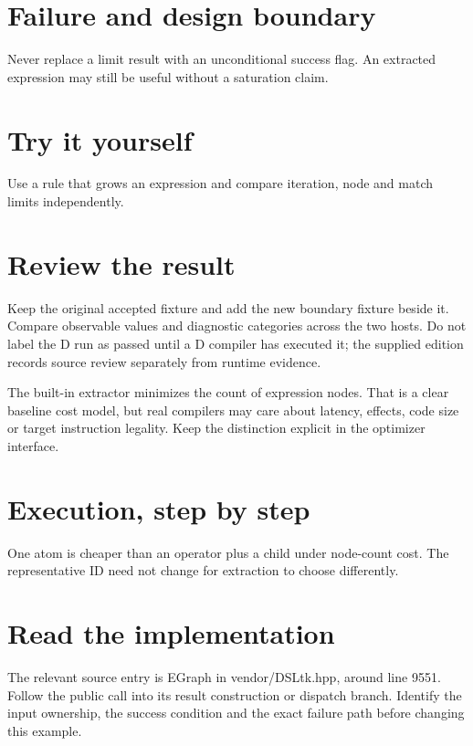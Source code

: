 
\section*{Failure and design boundary}
Never replace a limit result with an unconditional success flag. An extracted expression may still be useful without a saturation claim.

\section*{Try it yourself}
Use a rule that grows an expression and compare iteration, node and match limits independently.

\section*{Review the result}
Keep the original accepted fixture and add the new boundary fixture beside it. Compare observable values and diagnostic categories across the two hosts. Do not label the D run as passed until a D compiler has executed it; the supplied edition records source review separately from runtime evidence.

\clearpage
{}
The built-in extractor minimizes the count of expression nodes. That is a clear baseline cost model, but real compilers may care about latency, effects, code size or target instruction legality. Keep the distinction explicit in the optimizer interface.


\section*{Execution, step by step}
One atom is cheaper than an operator plus a child under node-count cost. The representative ID need not change for extraction to choose differently.

\section*{Read the implementation}
The relevant source entry is EGraph in vendor/DSLtk.hpp, around line 9551. Follow the public call into its result construction or dispatch branch. Identify the input ownership, the success condition and the exact failure path before changing this example.

